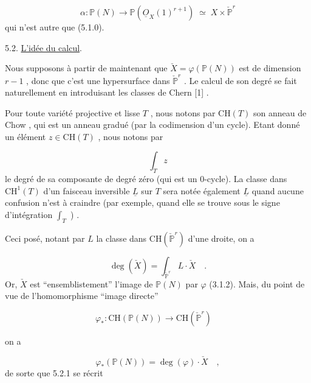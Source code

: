 \begin{equation}\tag{5.1.6}
\alpha : \mathbb{P}(N) \longrightarrow \mathbb{P}(\underline{O}_X(1)^{r+1}) \;\simeq\; X \times \check{\mathbb{P}}^r
\end{equation}
qui n'est autre que (5.1.0).




5.2.  \underline{L'idée du calcul}.

Nous supposons à partir de maintenant que $\check{X} = \varphi(\mathbb{P}(N))$ est de dimension $r-1$ , donc que c'est une hypersurface dans $\check{\mathbb{P}}^r$ . Le calcul de son degré se fait naturellement en introduisant les classes de Chern [1] .

Pour toute variété projective et lisse $T$ , nous notons par $\mathrm{CH}(T)$ son anneau de Chow , qui est un anneau gradué (par la codimension d'un cycle). Etant donné un élément $z \in \mathrm{CH}(T)$ , nous notons par

\begin{equation*}
\int_T z
\end{equation*}
le degré de sa composante de degré zéro (qui est un $0$-cycle). La classe dans $\mathrm{CH}^1(T)$ d'un faisceau inversible $\underline{L}$ sur $T$ sera notée également $\underline{L}$ quand aucune confusion n'est à craindre (par exemple, quand elle se trouve sous le signe d'intégration $\int_T$ ) .

Ceci posé, notant par $L$ la classe dans $\mathrm{CH}(\check{\mathbb{P}}^r)$ d'une droite, on a

\begin{equation}\tag{5.2.1}
\deg(\check{X}) = \int_{\check{\mathbb{P}}^r} L\cdot\check{X} \quad .
\end{equation}
Or, $\check{X}$ est ``ensemblistement'' l'image de $\mathbb{P}(N)$ par $\varphi$ (3.1.2). Mais, du point de vue de l'homomorphisme ``image directe''

\begin{equation*}
\varphi_* : \mathrm{CH}(\mathbb{P}(N)) \longrightarrow \mathrm{CH}(\check{\mathbb{P}}^r) \quad 
\end{equation*}


 on a

\begin{equation*}
\varphi_*( \mathbb{P}(N)) = \deg(\varphi)\cdot \check{X} \quad ,
\end{equation*}
de sorte que 5.2.1 se récrit

